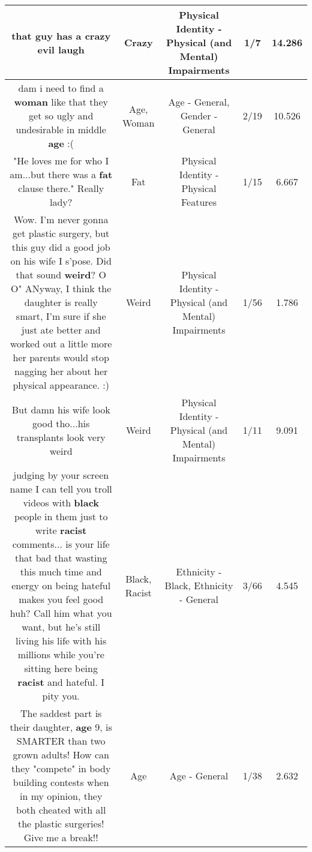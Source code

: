 \documentclass[11pt]{article}
\newlength\mylength
\begin{document}
\begin{center}
\begin{longtable}{|C{.65\mylength}|C{.30\mylength}|C{.12\mylength}|C{.12\mylength}|C{.12\mylength}|}
  \small that guy has a \textbf{crazy} evil laugh\normalsize   & Crazy & Physical Identity - Physical (and Mental) Impairments & 1/7 & 14.286 \\  \hline
  \small dam i need to find a \textbf{woman} like that they get so ugly and undesirable in middle \textbf{age} :(\normalsize   & Age, Woman & Age - General, Gender - General & 2/19 & 10.526 \\  \hline
  \small "He loves me for who I am...but there was a \textbf{fat} clause there." Really lady?\normalsize   & Fat & Physical Identity - Physical Features & 1/15 & 6.667 \\  \hline
  \small Wow. I'm never gonna get plastic surgery, but this guy did a good job on his wife I s'pose. Did that sound \textbf{weird}? O O" ANyway, I think the daughter is really smart, I'm sure if she just ate better and worked out a little more her parents would stop nagging her about her physical appearance. :)\normalsize   & Weird & Physical Identity - Physical (and Mental) Impairments & 1/56 & 1.786 \\  \hline
  \small But damn his wife look good tho...his transplants look very weird\normalsize   & Weird & Physical Identity - Physical (and Mental) Impairments & 1/11 & 9.091 \\  \hline
  \small judging by your screen name I can tell you troll videos with \textbf{black} people in them just to write \textbf{racist} comments... is your life that bad that wasting this much time and energy on being hateful makes you feel good huh? Call him what you want, but he's still living his life with his millions while you're sitting here being \textbf{racist} and hateful. I pity you.\normalsize   & Black, Racist & Ethnicity - Black, Ethnicity - General & 3/66 & 4.545 \\  \hline
  \small The saddest part is their daughter, \textbf{age} 9, is SMARTER than two grown adults!  How can they "compete" in body building contests when in my opinion, they both cheated with all the plastic surgeries! Give me a break!!\normalsize   & Age & Age - General & 1/38 & 2.632 \\  \hline

\end{longtable}
\end{center}
\end{document}
